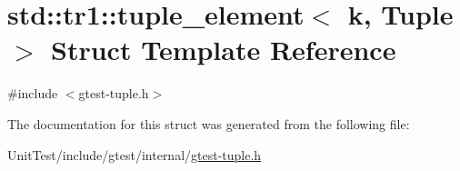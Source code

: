 \hypertarget{structstd_1_1tr1_1_1tuple__element}{\section{std\+:\+:tr1\+:\+:tuple\+\_\+element$<$ k, Tuple $>$ Struct Template Reference}
\label{structstd_1_1tr1_1_1tuple__element}
}


{\ttfamily \#include $<$gtest-\/tuple.\+h$>$}



The documentation for this struct was generated from the following file\+:\begin{DoxyCompactItemize}
\item 
Unit\+Test/include/gtest/internal/\hyperlink{gtest-tuple_8h}{gtest-\/tuple.\+h}\end{DoxyCompactItemize}
